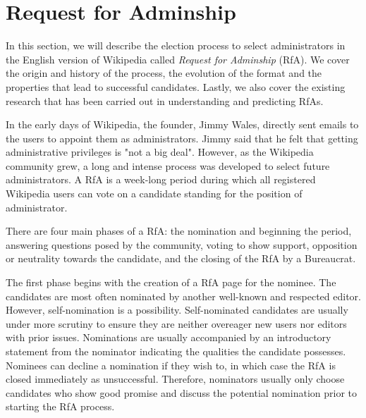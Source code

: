 \section{Request for Adminship}
\label{sec:rfa}
In this section, we will describe the election process to select administrators in the English version of Wikipedia called \textit{Request for Adminship} (RfA).
We cover the origin and history of the process, the evolution of the format and the properties that lead to successful candidates.
Lastly, we also cover the existing research that has been carried out in understanding and predicting RfAs.

In the early days of Wikipedia, the founder, Jimmy Wales, directly sent emails to the users to appoint them as administrators.
Jimmy said that he felt that getting administrative privileges is "not a big deal".
However, as the Wikipedia community grew, a long and intense process was developed to select future administrators.
A RfA is a week-long period during which all registered Wikipedia users can vote on a candidate standing for the position of administrator. 

There are four main phases of a RfA: the nomination and beginning the period, answering questions posed by the community, voting to show support, opposition or neutrality towards the candidate, and the closing of the RfA by a Bureaucrat.

The first phase begins with the creation of a RfA page for the nominee.
The candidates are most often nominated by another well-known and respected editor.
However, self-nomination is a possibility.
Self-nominated candidates are usually under more scrutiny to ensure they are neither overeager new users nor editors with prior issues.
Nominations are usually accompanied by an introductory statement from the nominator indicating the qualities the candidate possesses.
Nominees can decline a nomination if they wish to, in which case the RfA is closed immediately as unsuccessful.
Therefore, nominators usually only choose candidates who show good promise and discuss the potential nomination prior to starting the RfA process. 

